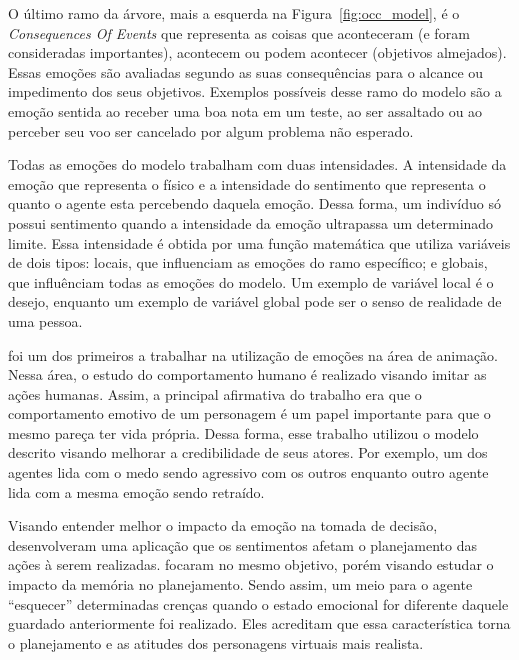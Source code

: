 O último ramo da árvore, mais a esquerda na Figura~\ref{fig:occ_model}, é o
\emph{Consequences Of Events} que representa as coisas que aconteceram (e
foram consideradas importantes), acontecem ou podem acontecer (objetivos
almejados)\dev{}. Essas emoções são avaliadas segundo as suas consequências
para o alcance ou impedimento dos seus objetivos. Exemplos possíveis desse
ramo do modelo são a emoção sentida ao receber uma boa nota em um teste, ao
ser assaltado ou ao perceber seu voo ser cancelado por algum problema não
esperado.

Todas as emoções do modelo trabalham com duas intensidades. A intensidade da
emoção que representa o físico e a intensidade do sentimento que representa o
quanto o agente esta percebendo daquela emoção. Dessa forma, um indivíduo só
possui sentimento quando a intensidade da emoção ultrapassa um
determinado limite\dev{}.  Essa intensidade é obtida por uma função matemática
que utiliza variáveis de dois tipos: locais, que influenciam as emoções do ramo
específico; e globais, que influênciam todas as emoções do modelo.  Um exemplo
de variável local é o desejo, enquanto um exemplo de variável global pode ser
o senso de realidade de uma pessoa.

\citet{bates1994role} foi um dos primeiros a trabalhar na utilização de emoções
na área de animação. Nessa área, o estudo do comportamento humano é realizado
visando imitar as ações humanas. Assim, a principal afirmativa do trabalho era
que o comportamento emotivo de um personagem é um papel importante para que o
mesmo pareça ter vida própria. Dessa forma, esse trabalho utilizou o modelo
descrito visando melhorar a credibilidade de seus atores. Por exemplo, um dos
agentes lida com o medo sendo agressivo com os outros enquanto outro agente
lida com a mesma emoção sendo retraído.


Visando entender melhor o impacto da emoção na tomada de decisão,
\citet{zhang2009emotional} desenvolveram uma aplicação que os sentimentos
afetam o planejamento das ações à serem realizadas.
\citet{neto2010construction} focaram no mesmo objetivo, porém visando estudar
o impacto da memória no planejamento. Sendo assim, um meio para o agente
``esquecer'' determinadas crenças quando o estado emocional for diferente
daquele guardado anteriormente foi realizado. Eles acreditam que essa
característica torna o planejamento e as atitudes dos personagens virtuais
mais realista.

